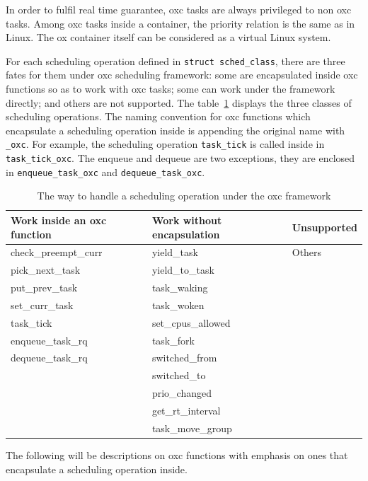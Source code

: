 In order to fulfil real time guarantee, oxc tasks are always privileged
to non oxc tasks. Among oxc tasks inside a container, the priority relation
is the same as in Linux. The ox container itself can be considered as a 
virtual Linux system.

For each scheduling operation defined in \texttt{struct sched\_class},
there are three fates for them under oxc scheduling framework: 
some are encapsulated inside oxc functions so as to work with oxc tasks; 
some can work under the framework directly; and others are not supported. 
The table~\ref{tab:op_classes} displays the three classes of scheduling 
operations. The naming convention for oxc functions which encapsulate 
a scheduling operation inside is appending the original name with 
\texttt{\_oxc}. For example, the scheduling operation
\texttt{task\_tick} is called inside in \texttt{task\_tick\_oxc}.
The enqueue and dequeue are two exceptions, they are enclosed in 
\texttt{enqueue\_task\_oxc} and \texttt{dequeue\_task\_oxc}.

\begin{table}[thbp]
  \centering
  \begin{tabular}{l|l|l}\hline
	\small{Work inside an oxc function} & \small{Work without encapsulation} & \small{Unsupported}\\\hline
		check\_preempt\_curr	& yield\_task				& Others	\\
		pick\_next\_task	& yield\_to\_task			&		\\
		put\_prev\_task		& task\_waking				&		\\
		set\_curr\_task		& task\_woken				&		\\
		task\_tick		& set\_cpus\_allowed			&		\\
		enqueue\_task\_rq	& task\_fork				&		\\
		dequeue\_task\_rq	& switched\_from			&		\\
					& switched\_to				&		\\
					& prio\_changed				&		\\
					& get\_rt\_interval			&		\\
					& task\_move\_group			&		\\\hline
  \end{tabular}	
  \caption{The way to handle a scheduling operation under the oxc framework}
  \label{tab:op_classes}
\end{table}

The following will be descriptions on oxc functions with emphasis on ones that
encapsulate a scheduling operation inside.

